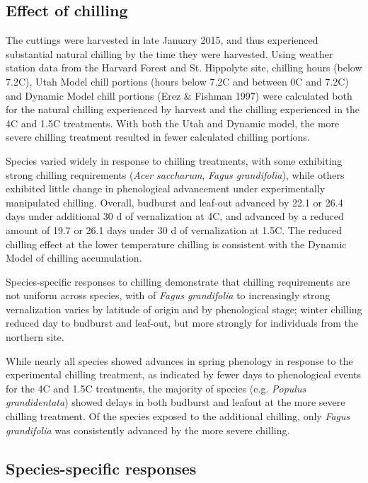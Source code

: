 \documentclass{article}
\begin{document}
\subsection*{Effect of chilling}
The cuttings were harvested in late January 2015, and thus experienced substantial natural chilling by the time they were harvested. Using weather station data from the Harvard Forest and St. Hippolyte site, chilling hours (below 7.2\degree C), Utah Model chill portions (hours below 7.2\degree C and between 0\degree C and 7.2\degree C) and Dynamic Model chill portions (Erez \& Fishman 1997) were calculated both for the natural chilling experienced by harvest and the chilling experienced in the 4\degree C and 1.5\degree C treatments. With both the Utah and Dynamic model, the more severe chilling treatment resulted in fewer calculated chilling portions. %

Species varied widely in response to chilling treatments, with some exhibiting strong chilling requirements (\emph{Acer saccharum}, \emph{Fagus grandifolia}), while others exhibited little change in phenological advancement under experimentally manipulated chilling. Overall, budburst and leaf-out advanced by 22.1 or 26.4 days under additional 30 d of vernalization at 4\degree C, and advanced by a reduced amount of 19.7 or 26.1 days under 30 d of vernalization at 1.5\degree C. The reduced chilling effect at the lower temperature chilling is consistent with the Dynamic Model of chilling accumulation. %

Species-specific responses to chilling demonstrate that chilling requirements are not uniform across species, with 
of \emph{Fagus grandifolia} to increasingly strong vernalization varies by latitude of origin and by phenological stage; winter chilling reduced day to budburst and leaf-out, but more strongly for individuals from the northern site.

While nearly all species showed advances in spring phenology in response to the experimental chilling treatment, as indicated by fewer days to phenological events for the 4\degree C and 1.5\degree C treatments, the majority of species (e.g. \emph{Populus grandidentata}) showed delays in both budburst and leafout at the more severe chilling treatment. Of the species exposed to the additional chilling, only \emph{Fagus grandifolia} was consistently advanced by the more severe chilling.

\subsection*{Species-specific responses}
\end{document}
